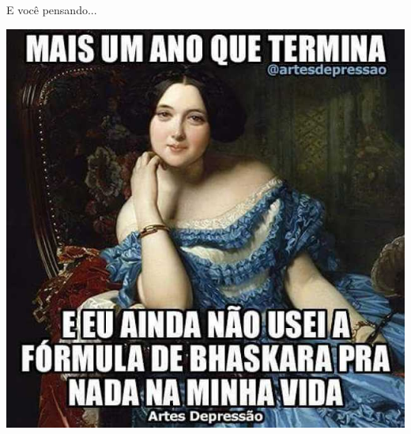 \documentclass{beamer}
\begin{document}
\begin{frame}{\small E você pensando...}
    \begin{center}
      \includegraphics[height=.8\textheight]{Cap18-19/bhaskara}
    \end{center}
\end{frame}
\end{document}
